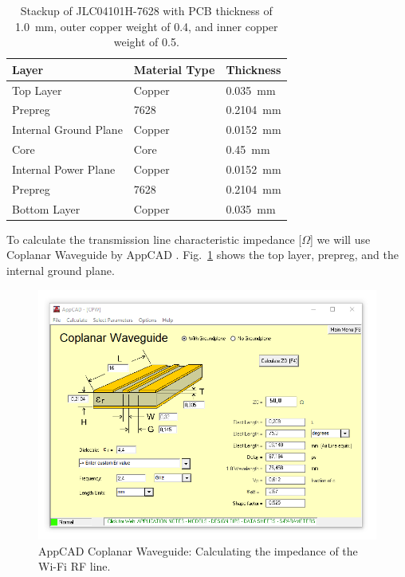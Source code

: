 \begin{table}[H]
    \centering
    \caption{Stackup of JLC04101H-7628 with PCB thickness of \SI{1.0}{\milli\meter}, outer copper weight of \SI{0.4}{\ounce}, and inner copper weight of \SI{0.5}{\ounce}\protect\footnotemark.}
    \label{tab:pcb_stackup}
    \begin{tabular}{p{4cm}p{4cm}p{4cm}}
    \textbf{Layer} & \textbf{Material Type} & \textbf{Thickness} \\ \hline
    Top Layer & \cellcolor{copper_green}Copper & \SI{0.035}{\milli\meter} \\
    Prepreg & 7628 & \SI{0.2104}{\milli\meter} \\
    Internal Ground Plane & \cellcolor{copper_green}Copper & \cellcolor{core_yellow}\SI{0.0152}{\milli\meter} \\
    Core & \cellcolor{core_yellow}Core & \cellcolor{core_yellow}\SI{0.45}{\milli\meter} \\
    Internal Power Plane & \cellcolor{copper_green}Copper & \cellcolor{core_yellow}\SI{0.0152}{\milli\meter} \\
    Prepreg & 7628 & \SI{0.2104}{\milli\meter} \\
    Bottom Layer & \cellcolor{copper_green}Copper & \SI{0.035}{\milli\meter}
    \end{tabular}
\end{table}

To calculate the transmission line characteristic impedance [$\Omega$] we will use Coplanar Waveguide by AppCAD . Fig.~\ref{fig:appcad} shows the top layer, prepreg, and the internal ground plane.

\begin{figure}[H]
    \centering
    \includegraphics[width=1.0\textwidth]{figures/appcad_16.PNG}
    \caption{AppCAD Coplanar Waveguide: Calculating the impedance of the Wi-Fi RF line.}
    \label{fig:appcad}
\end{figure}

